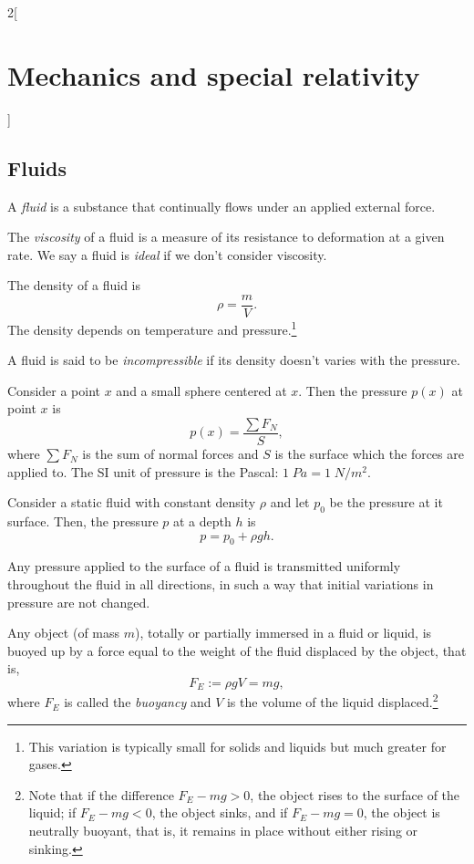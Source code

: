 \documentclass[class=article,10pt,crop=false]{standalone}
\begin{document}
\begin{multicols}{2}[\section{Mechanics and special relativity}]
\subsection{Fluids}
\begin{definition}
A \textit{fluid} is a substance that continually flows under an applied external force.
\end{definition}
\begin{definition}
The \textit{viscosity} of a fluid is a measure of its resistance to deformation at a given rate. We say a fluid is \textit{ideal} if we don't consider viscosity.
\end{definition}
\begin{concept}[Density]
The density of a fluid is $$\rho=\frac{m}{V}.$$ The density depends on temperature and pressure.\footnote{This variation is typically small for solids and liquids but much greater for gases.}
\end{concept}
\begin{definition}
A fluid is said to be \textit{incompressible} if its density doesn't varies with the pressure. 
\end{definition}
\begin{concept}[Pressure]
Consider a point $x$ and a small sphere centered at $x$. Then the pressure $p(x)$ at point $x$ is $$p(x)=\frac{\sum F_N}{S},$$ where $\sum F_N$ is the sum of normal forces and $S$ is the surface which the forces are applied to. The SI unit of pressure is the Pascal: $1\;Pa=1\;N/m^2$.
\end{concept}
\begin{concept}
Consider a static fluid with constant density $\rho$ and let $p_0$ be the pressure at it surface. Then, the pressure $p$ at a depth $h$ is $$p=p_0+\rho gh.$$
\end{concept}
\begin{concept}
Any pressure applied to the surface of a fluid is transmitted uniformly throughout the fluid in all directions, in such a way that initial variations in pressure are not changed.
\end{concept}
\begin{concept}
Any object (of mass $m$), totally or partially immersed in a fluid or liquid, is buoyed up by a force equal to the weight of the fluid displaced by the object, that is, $$F_E:=\rho gV=mg,$$ where $F_E$ is called the \textit{buoyancy} and $V$ is the volume of the liquid displaced.\footnote{Note that if the difference $F_E-mg>0$, the object rises to the surface of the liquid; if $F_E-mg<0$, the object sinks, and if $F_E-mg=0$, the object is neutrally buoyant, that is, it remains in place without either rising or sinking.}

\end{concept}
\end{multicols}
\end{document}
